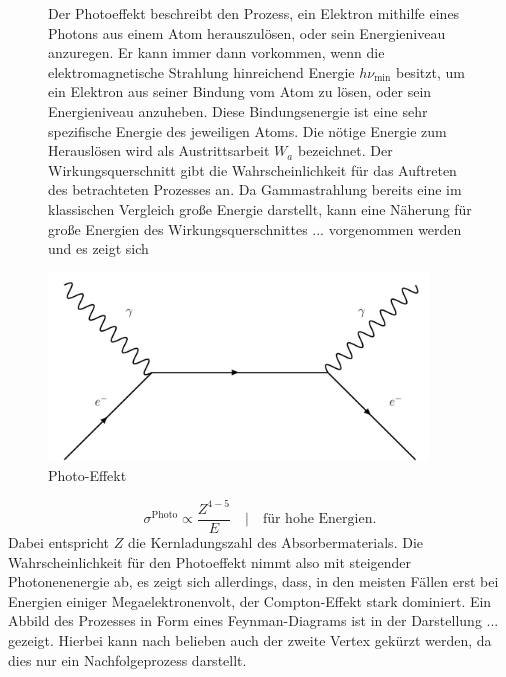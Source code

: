 \begin{figure}
\begin{minipage}{0.5\textwidth}
Der Photoeffekt beschreibt den Prozess, ein Elektron mithilfe eines Photons aus einem Atom herauszulösen, oder sein Energieniveau anzuregen. 
Er kann immer dann vorkommen, wenn die elektromagnetische Strahlung hinreichend Energie $h\nu_{\text{min}}$ besitzt, um ein Elektron aus seiner Bindung vom Atom zu lösen, oder sein Energieniveau anzuheben. 
Diese Bindungsenergie ist eine sehr spezifische Energie des jeweiligen Atoms. Die nötige Energie zum Herauslösen wird als Austrittsarbeit $W_a$ bezeichnet. 
Der Wirkungsquerschnitt gibt die Wahrscheinlichkeit für das Auftreten des betrachteten Prozesses an.
Da Gammastrahlung bereits eine im klassischen Vergleich große Energie darstellt, kann eine Näherung für große Energien des Wirkungsquerschnittes ... vorgenommen werden und es zeigt sich
\end{minipage}
\begin{minipage}{0.5\textwidth}
    \centering
    \includegraphics[width=0.9\textwidth]{bilder/compton.pdf}
    \caption{Photo-Effekt}
\end{minipage}
\end{figure}

\begin{equation}
\sigma^{\text{Photo}} \propto \frac{Z^{4-5}}{E} \quad | \quad \text{für hohe Energien}.
\end{equation}
Dabei entspricht $Z$ die Kernladungszahl des Absorbermaterials. 
Die Wahrscheinlichkeit für den Photoeffekt nimmt also mit steigender Photonenenergie ab, es zeigt sich allerdings, dass, in den meisten Fällen erst bei Energien einiger Megaelektronenvolt, der Compton-Effekt stark dominiert. 
Ein Abbild des Prozesses in Form eines Feynman-Diagrams ist in der Darstellung ... gezeigt. Hierbei kann nach belieben auch der zweite Vertex gekürzt werden, da dies nur ein Nachfolgeprozess darstellt.
\newpage
